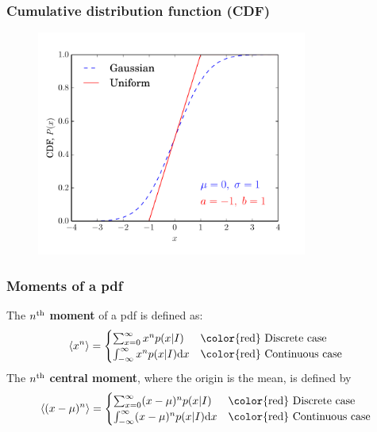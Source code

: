 \begin{frame}

\frametitle{Cumulative distribution function (CDF)}
\label{cumulativedistributionfunctioncdf}

\begin{figure}[htbp]
\centering
\includegraphics[keepaspectratio,width=\textwidth,height=210pt]{figures/cdfs.pdf}
\label{cdf}
\end{figure}

\end{frame}

\begin{frame}

\frametitle{Moments of a pdf}
\label{momentsofapdf}

The $n^{\rm th}$ \textbf{moment} of a pdf is defined as:
\[
\langle x^n \rangle = 
\begin{cases}
    \sum_{x=0}^{\infty} x^n p(x|I) & \text{\color{red} Discrete case}\\
    \int_{-\infty}^{\infty} x^n p(x|I) {\rm d}x & \text{\color{red} Continuous case}
\end{cases}
\]
The $n^{\rm th}$ \textbf{central moment}, where the origin is the mean, is defined by
\[
\langle (x-\mu)^n \rangle = 
\begin{cases}
    \sum_{x=0}^{\infty} (x-\mu)^n p(x|I) & \text{\color{red} Discrete case}\\
    \int_{-\infty}^{\infty} (x-\mu)^n p(x|I) {\rm d}x & \text{\color{red} Continuous case}
\end{cases}
\]

\end{frame}

